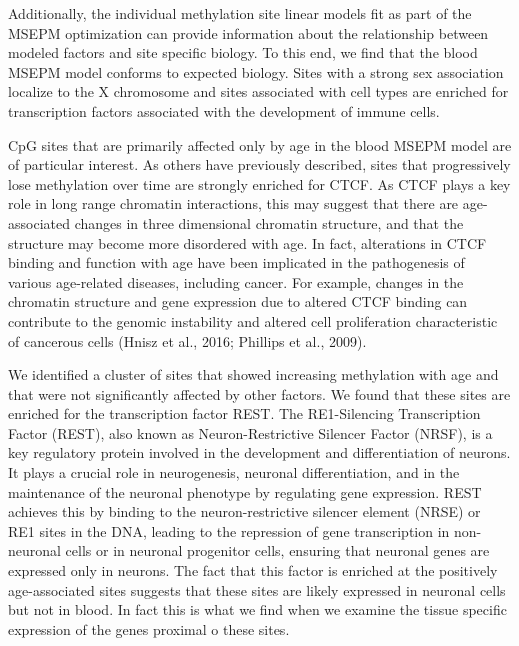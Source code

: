 \documentclass{article}
\begin{document}
{\begin{linenumbers}
Additionally, the individual methylation site linear models fit as part of the MSEPM optimization can provide 
information about the relationship between modeled factors and site specific biology.  To this end, we find that 
the blood MSEPM model conforms to expected biology. Sites with a strong sex association localize to the X chromosome
 and sites associated with cell types are enriched for transcription factors associated with the development of immune cells. 

CpG sites that are primarily affected only by age in the blood MSEPM model are of particular interest. As 
others have previously described, sites that progressively lose methylation over time are strongly enriched for
 CTCF\cite{De_Lima_Camillo2022-lu,Han2020-zj}.  As CTCF plays a key role in long range chromatin interactions, 
 this may suggest that there are age-associated changes in three dimensional chromatin structure, and that the  
 structure may become more disordered with age. In fact, alterations in CTCF binding and function with age 
 have been implicated in the pathogenesis of various age-related diseases, including cancer. For example, 
 changes in the chromatin structure and gene expression due to altered CTCF binding can contribute to the 
 genomic instability and altered cell proliferation characteristic of cancerous cells (Hnisz et al., 2016; Phillips et al., 2009).

We identified a cluster of sites that showed increasing methylation with age and that were not significantly 
affected by other factors.  We found that these sites are enriched for the transcription factor REST. The RE1-Silencing 
Transcription Factor (REST), also known as Neuron-Restrictive Silencer Factor (NRSF), is a key regulatory protein 
involved in the development and differentiation of neurons. It plays a crucial role in neurogenesis, neuronal 
differentiation, and in the maintenance of the neuronal phenotype by regulating gene expression\cite{Schoenherr1995-fc}. 
REST achieves this by binding to the neuron-restrictive silencer element (NRSE) or RE1 sites in the DNA, leading to the 
repression of gene transcription in non-neuronal cells or in neuronal progenitor cells, ensuring that neuronal genes 
are expressed only in neurons\cite{Chong1995-dj,Ooi2007-kk,Bruce2004-je}.  The fact that this factor 
is enriched at the positively age-associated sites suggests that these sites are likely expressed in neuronal cells 
but not in blood.  In fact this is what we find when we examine the tissue specific expression of the genes proximal 
o these sites.


\end{linenumbers}}
\end{document}
